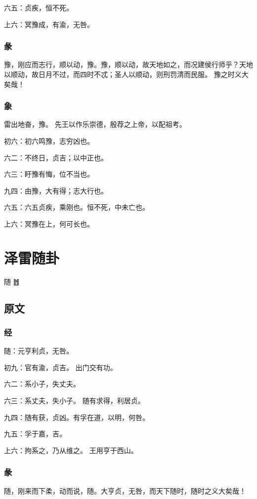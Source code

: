 \documentclass[12pt,oneside]{book}
\begin{document}
六五：贞疾，恒不死。

上六：冥豫成，有渝，无咎。

\subsection{彖}
豫，刚应而志行，顺以动，豫。豫，顺以动，故天地如之，而况建侯行师乎？天地以顺动，故日月不过，而四时不忒；圣人以顺动，则刑罚清而民服。 豫之时义大矣哉！

\subsection{象}
雷出地奋，豫。 先王以作乐崇德，殷荐之上帝，以配祖考。

初六：初六鸣豫，志穷凶也。

六二：不终日，贞吉；以中正也。

六三：盱豫有悔，位不当也。

九四：由豫，大有得；志大行也。

六五：六五贞疾，乘刚也。恒不死，中未亡也。

上六：冥豫在上，何可长也。


\chapter{泽雷随卦}
随 {\Large ䷐}

\section{原文}

\subsection{经}
随：元亨利贞，无咎。

初九：官有渝，贞吉。 出门交有功。

六二：系小子，失丈夫。

六三：系丈夫，失小子。 随有求得，利居贞。

九四：随有获，贞凶。有孚在道，以明，何咎。

九五：孚于嘉，吉。

上六：拘系之，乃从维之。 王用亨于西山。

\subsection{彖}
随，刚来而下柔，动而说，随。大亨贞，无咎，而天下随时，随时之义大矣哉！
\end{document}
